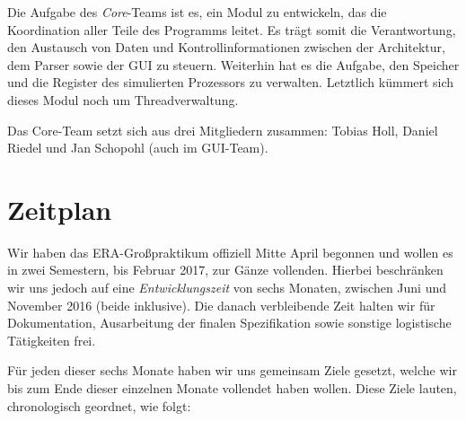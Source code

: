 Die Aufgabe des \emph{Core}-Teams ist es, ein Modul zu entwickeln, das die
Koordination aller Teile des Programms leitet. Es trägt somit die Verantwortung,
den Austausch von Daten und Kontrollinformationen zwischen der Architektur, dem
Parser sowie der GUI zu steuern. Weiterhin hat es die Aufgabe, den Speicher und
die Register des simulierten Prozessors zu verwalten. Letztlich kümmert sich
dieses Modul noch um Threadverwaltung.

Das Core-Team setzt sich aus drei Mitgliedern zusammen: Tobias Holl, Daniel
Riedel und Jan Schopohl (auch im GUI-Team).

\section{Zeitplan}

Wir haben das ERA-Großpraktikum offiziell Mitte April begonnen und wollen es in
zwei Semestern, bis Februar 2017, zur Gänze vollenden. Hierbei beschränken wir
uns jedoch auf eine \emph{Entwicklungszeit} von sechs Monaten, zwischen Juni und
November 2016 (beide inklusive). Die danach verbleibende Zeit halten wir für
Dokumentation, Ausarbeitung der finalen Spezifikation sowie sonstige
logistische Tätigkeiten frei.

Für jeden dieser sechs Monate haben wir uns gemeinsam Ziele gesetzt, welche wir
bis zum Ende dieser einzelnen Monate vollendet haben wollen. Diese Ziele lauten,
chronologisch geordnet, wie folgt:

